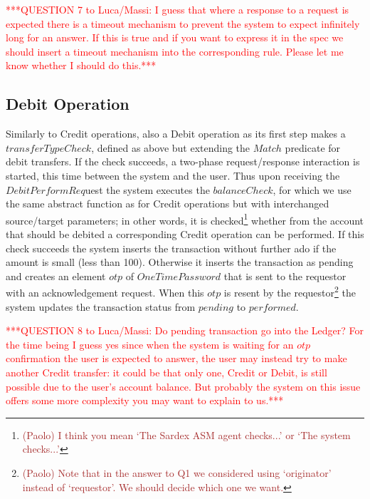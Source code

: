 \textcolor{red}{***QUESTION 7 to Luca/Massi: I guess that where a response to a request is expected there is a timeout mechanism to prevent the system to expect infinitely long for an answer. If this is true and if you want to express it in the spec we should insert a timeout mechanism into the corresponding rule. Please let me know whether I should do this.***}
\vspace{12pt}

\subsection{Debit Operation}
Similarly to Credit operations, also a Debit operation as its first step makes a $transferTypeCheck$, defined as above but extending the $Match$ predicate for debit transfers. If the check succeeds, a two-phase request/response interaction is started, this time between the system and the user. Thus upon receiving the $DebitPerformReq$uest the system executes the $balanceCheck$, for which we use the same abstract function as for Credit operations but with interchanged source/target parameters; in other words, it is checked\footnote{\textcolor{brown}{(Paolo) I think you mean `The Sardex ASM agent checks...' or `The system checks...'}} whether from the account that should be debited a corresponding Credit operation can be performed. If this check succeeds the system inserts the transaction without further ado if the amount is small (less than 100). Otherwise it inserts the transaction as pending and creates an element $otp$ of $OneTimePassword$ that is sent to the requestor with an acknowledgement request. When this $otp$ is resent by the requestor\footnote{\textcolor{brown}{(Paolo) Note that in the answer to Q1 we considered using `originator' instead of `requestor'. We should decide which one we want.}} the system updates the transaction status from $pending$ to $performed$.

\vspace{12pt}
\textcolor{red}{***QUESTION 8 to Luca/Massi: Do pending transaction go into the Ledger? For the time being I guess yes since when the system is waiting for an $otp$ confirmation the user is expected to answer, the user may instead try to make another Credit transfer: it could be that only one, Credit or Debit, is still possible due to the user's account balance. But probably the system on this issue offers some more complexity you may want to explain to us.***}
\vspace{12pt}

